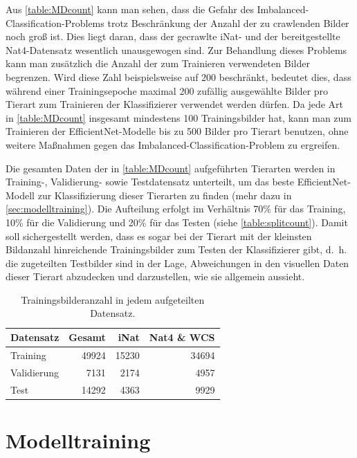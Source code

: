 Aus \autoref{table:MDcount} kann man sehen, dass die Gefahr des Imbalanced-Classification-Problems trotz Beschränkung der Anzahl der zu crawlenden Bilder noch groß ist. Dies liegt daran, dass der gecrawlte iNat- und der bereitgestellte Nat4-Datensatz wesentlich unausgewogen sind. Zur Behandlung dieses Problems kann man zusätzlich die Anzahl der zum Trainieren verwendeten Bilder begrenzen. Wird diese Zahl beispielsweise auf 200 beschränkt, bedeutet dies, dass während einer Trainingsepoche maximal 200 zufällig ausgewählte Bilder pro Tierart zum Trainieren der Klassifizierer verwendet werden dürfen. Da jede Art in \autoref{table:MDcount} insgesamt mindestens 100 Trainingsbilder hat, kann man zum Trainieren der EfficientNet-Modelle bis zu 500 Bilder pro Tierart benutzen, ohne weitere Maßnahmen gegen das Imbalanced-Classification-Problem zu ergreifen.

Die gesamten Daten der in \autoref{table:MDcount} aufgeführten Tierarten werden in Training-, Validierung- sowie Testdatensatz unterteilt, um das beste EfficientNet-Modell zur Klassifizierung dieser Tierarten zu finden (mehr dazu in \autoref{sec:modelltraining}). Die Aufteilung erfolgt im Verhältnis 70\% für das Training, 10\% für die Validierung und 20\% für das Testen (siehe \autoref{table:splitcount}). Damit soll sichergestellt werden, dass es sogar bei der Tierart mit der kleinsten Bildanzahl hinreichende Trainingsbilder zum Testen der Klassifizierer gibt, d.~h. die zugeteilten Testbilder sind in der Lage, Abweichungen in den visuellen Daten dieser Tierart abzudecken und darzustellen, wie sie allgemein aussieht.

\begin{table}[h]
	\centering
	\caption{Trainingsbilderanzahl in jedem aufgeteilten Datensatz.}
	\label{table:splitcount}
	\begin{tabular}{l|r|r|r}
		\textbf{Datensatz}   & \textbf{Gesamt} & \textbf{iNat}  & \textbf{Nat4 \& WCS} \\
		\hline
		Training    & 49924  & 15230 & 34694       \\
		Validierung & 7131   & 2174  & 4957        \\
		Test        & 14292  & 4363  & 9929       
	\end{tabular}
\end{table}

\section{Modelltraining} \label{sec:modelltraining}

